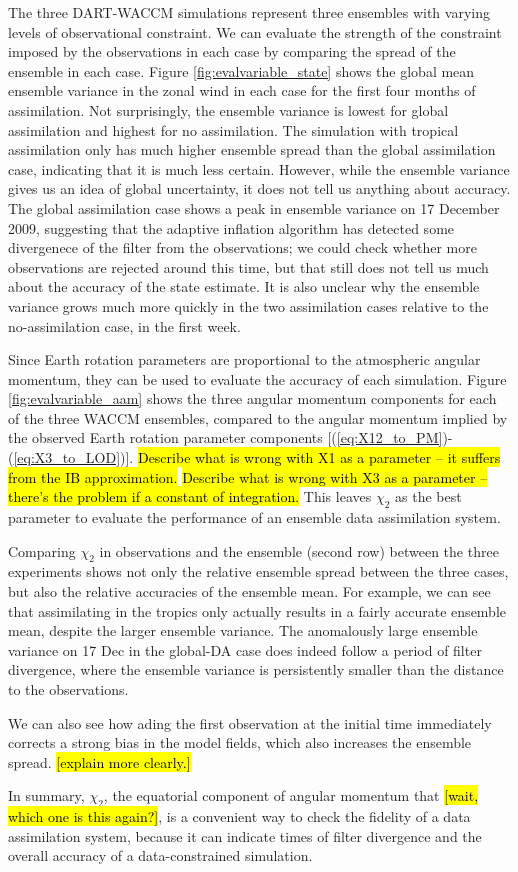 The three DART-WACCM simulations represent three ensembles with varying levels of observational constraint. 
We can evaluate the strength of the constraint imposed by the observations in each case by comparing the spread of the ensemble in each case. 
Figure \ref{fig:evalvariable_state} shows the global mean ensemble variance in the zonal wind in each case for the first four months of assimilation. 
Not surprisingly, the ensemble variance is lowest for global assimilation and highest for no assimilation.
The simulation with tropical assimilation only has much higher ensemble spread than the global assimilation case, indicating that it is much less certain. 
However, while the ensemble variance gives us an idea of global uncertainty, it does not tell us anything about accuracy. 
The global assimilation case shows a peak in ensemble variance on 17 December 2009, suggesting that the adaptive inflation algorithm has detected some divergenece of the filter from the observations; we could check whether more observations are rejected around this time, but that still does not tell us much about the accuracy of the state estimate. 
It is also unclear why the ensemble variance grows much more quickly in the two assimilation cases relative to the no-assimilation case, in the first week. 

Since Earth rotation parameters are proportional to the atmospheric angular momentum, they can be used to evaluate the accuracy of each simulation. 
Figure \ref{fig:evalvariable_aam} shows the three angular momentum components for each of the three WACCM ensembles, compared to the angular momentum implied by the observed Earth rotation parameter components [(\ref{eq:X12_to_PM})-(\ref{eq:X3_to_LOD})]. 
\hl{Describe what is wrong with X1 as a parameter -- it suffers from the IB approximation.}
\hl{Describe what is wrong with X3 as a parameter -- there's the problem if a constant of integration.}
This leaves $\chi_2$ as the best parameter to evaluate the performance of an ensemble data assimilation system. 

Comparing $\chi_2$ in observations and the ensemble (second row) between the three experiments shows not only the relative ensemble spread between the three cases, but also the relative accuracies of the ensemble mean. 
For example, we can see that assimilating in the tropics only actually results in a fairly accurate ensemble mean, despite the larger ensemble variance. 
The anomalously large ensemble variance on 17 Dec in the global-DA case does indeed follow a period of filter divergence, where the ensemble variance is persistently smaller than the distance to the observations. 

We can also see how ading the first observation at the initial time immediately corrects a strong bias in the model fields, which also increases the ensemble spread. 
\hl{[explain more clearly.]}

In summary, $\chi_2$, the equatorial component of angular momentum that \hl{[wait, which one is this again?]}, is a convenient way to check the fidelity of a data assimilation system, because it can indicate times of filter divergence and the overall accuracy of a data-constrained simulation. 

